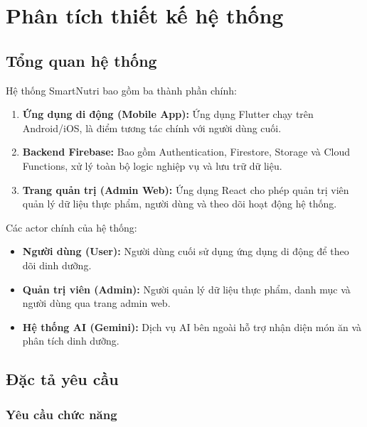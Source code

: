 
\chapter{Phân tích thiết kế hệ thống}

\section{Tổng quan hệ thống}

Hệ thống SmartNutri bao gồm ba thành phần chính:

\begin{enumerate}
    \item \textbf{Ứng dụng di động (Mobile App):} Ứng dụng Flutter chạy trên Android/iOS, là điểm tương tác chính với người dùng cuối.
    \item \textbf{Backend Firebase:} Bao gồm Authentication, Firestore, Storage và Cloud Functions, xử lý toàn bộ logic nghiệp vụ và lưu trữ dữ liệu.
    \item \textbf{Trang quản trị (Admin Web):} Ứng dụng React cho phép quản trị viên quản lý dữ liệu thực phẩm, người dùng và theo dõi hoạt động hệ thống.
\end{enumerate}

Các actor chính của hệ thống:
\begin{itemize}
    \item \textbf{Người dùng (User):} Người dùng cuối sử dụng ứng dụng di động để theo dõi dinh dưỡng.
    \item \textbf{Quản trị viên (Admin):} Người quản lý dữ liệu thực phẩm, danh mục và người dùng qua trang admin web.
    \item \textbf{Hệ thống AI (Gemini):} Dịch vụ AI bên ngoài hỗ trợ nhận diện món ăn và phân tích dinh dưỡng.
\end{itemize}

\section{Đặc tả yêu cầu}

\subsection{Yêu cầu chức năng}

